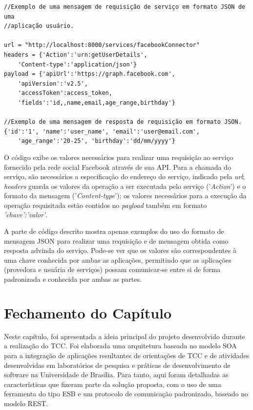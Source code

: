 \begin{lstlisting}
//Exemplo de uma mensagem de requisição de serviço em formato JSON de uma 
//aplicação usuário.

url = "http://localhost:8000/services/facebookConnector"
headers = {'Action':'urn:getUserDetails', 
	'Content-type':'application/json'}
payload = {'apiUrl':'https://graph.facebook.com', 
	'apiVersion':'v2.5',
	'accessToken':access_token,
	'fields':'id,,name,email,age_range,birthday'}

//Exemplo de uma mensagem de resposta de requisição em formato JSON.
{'id':'1', 'name':'user_name', 'email':'user@email.com', 
	'age_range':'20-25', 'birthday':'dd/mm/yyyy'}
\end{lstlisting}

O código exibe os valores necessários para realizar uma requisição ao serviço fornecido pela rede social Facebook através de sua API. Para a chamada do serviço, são necessários a especificação do endereço do serviço, indicado pela \textit{url}; \textit{headers} guarda os valores da operação a ser executada pelo serviço ('\textit{Action}') e o formato da mensagem ('\textit{Content-type}'); os valores necessários para a execução da operação requisitada estão contidos no \textit{payload} também em formato \textit{{'chave':'valor'}}.

A parte de código descrito mostra apenas exemplos do uso do formato de mensagem JSON para realizar uma requisição e de mensagem obtida como resposta advinda do serviço. Pode-se ver que os valores são correspondentes à uma chave conhecida por ambas as aplicações, permitindo que as aplicações (provedora e usuária de serviços) possam comunicar-se entre si de forma padronizada e conhecida por ambas as partes.

\section{Fechamento do Capítulo}
Neste capítulo, foi apresentada a ideia principal do projeto desenvolvido durante a realização do TCC. Foi elaborada uma arquitetura baseada no modelo SOA para a integração de aplicações resultantes de orientações de TCC e de atividades  desenvolvidas em laboratórios de pesquisa e práticas de desenvolvimento de software na Universidade de Brasília. Para tanto, aqui foram detalhadas as características que fizeram parte da solução proposta, com o uso de uma ferramenta do tipo ESB e um protocolo de comunicação padronizado, baseado no modelo REST.


